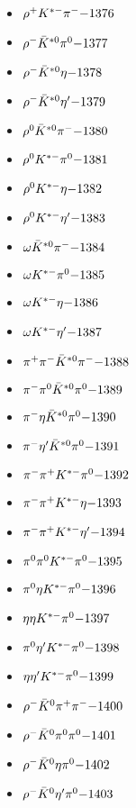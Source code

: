 \begin{multicols}{3}
\begin{itemize}
 \item $ \rho^{+} K^{*-} \pi^{-} \hfill{-1376}$
 \item $ \rho^{-} \bar{K}^{*0} \pi^{0} \hfill{-1377}$
 \item $ \rho^{-} \bar{K}^{*0} \eta \hfill{-1378}$
 \item $ \rho^{-} \bar{K}^{*0} {\eta^{\prime}} \hfill{-1379}$
 \item $ \rho^{0} \bar{K}^{*0} \pi^{-} \hfill{-1380}$
 \item $ \rho^{0} K^{*-} \pi^{0} \hfill{-1381}$
 \item $ \rho^{0} K^{*-} \eta \hfill{-1382}$
 \item $ \rho^{0} K^{*-} {\eta^{\prime}} \hfill{-1383}$
 \item $ \omega \bar{K}^{*0} \pi^{-} \hfill{-1384}$
 \item $ \omega K^{*-} \pi^{0} \hfill{-1385}$
 \item $ \omega K^{*-} \eta \hfill{-1386}$
 \item $ \omega K^{*-} {\eta^{\prime}} \hfill{-1387}$
 \item $ \pi^{+} \pi^{-} \bar{K}^{*0} \pi^{-} \hfill{-1388}$
 \item $ \pi^{-} \pi^{0} \bar{K}^{*0} \pi^{0} \hfill{-1389}$
 \item $ \pi^{-} \eta \bar{K}^{*0} \pi^{0} \hfill{-1390}$
 \item $ \pi^{-} {\eta^{\prime}} \bar{K}^{*0} \pi^{0} \hfill{-1391}$
 \item $ \pi^{-} \pi^{+} K^{*-} \pi^{0} \hfill{-1392}$
 \item $ \pi^{-} \pi^{+} K^{*-} \eta \hfill{-1393}$
 \item $ \pi^{-} \pi^{+} K^{*-} {\eta^{\prime}} \hfill{-1394}$
 \item $ \pi^{0} \pi^{0} K^{*-} \pi^{0} \hfill{-1395}$
 \item $ \pi^{0} \eta K^{*-} \pi^{0} \hfill{-1396}$
 \item $ \eta \eta K^{*-} \pi^{0} \hfill{-1397}$
 \item $ \pi^{0} {\eta^{\prime}} K^{*-} \pi^{0} \hfill{-1398}$
 \item $ \eta {\eta^{\prime}} K^{*-} \pi^{0} \hfill{-1399}$
 \item $ \rho^{-} \bar{K}^{0} \pi^{+} \pi^{-} \hfill{-1400}$
 \item $ \rho^{-} \bar{K}^{0} \pi^{0} \pi^{0} \hfill{-1401}$
 \item $ \rho^{-} \bar{K}^{0} \eta \pi^{0} \hfill{-1402}$
 \item $ \rho^{-} \bar{K}^{0} {\eta^{\prime}} \pi^{0} \hfill{-1403}$

\end{itemize}
\end{multicols}
